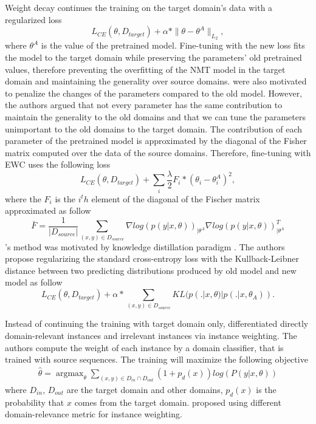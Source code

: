 Weight decay \citep{Miceli17regularization} continues the training on the target domain's data with a regularized loss 
\begin{equation}
L_{CE}(\theta,\mathit{D}_{target}) + \alpha * \parallel \theta - \theta^{A} \parallel_{L_2},
\end{equation}
where $\theta^{A}$ is the value of the pretrained model. Fine-tuning with the new loss fits the model to the target domain while preserving the parameters' old pretrained values, therefore preventing the overfitting of the NMT model in the target domain and maintaining the generality over source domains. \citet{Brian19overcoming, Kirk16overcoming, Saunders19domain} were also motivated to penalize the changes of the parameters compared to the old model. However, the authors argued that not every parameter has the same contribution to maintain the generality to the old domains and that we can tune the parameters unimportant to the old domains to the target domain. The contribution of each parameter of the pretrained model is approximated by the diagonal of the Fisher matrix computed over the data of the source domains. Therefore, fine-tuning with EWC uses the following loss
\begin{equation}
L_{CE}(\theta,\mathit{D}_{target}) + \sum_{i} \frac{\lambda}{2} F_i * (\theta_i - \theta_i^{A})^2,
\end{equation}
where the $F_i$ is the $i^th$ element of the diagonal of the Fischer matrix approximated as follow
\begin{equation}
\bar{F} = \frac{1}{|\mathit{D}_{source}|} \displaystyle{\mathop{\sum}_{(x,y)\in \mathit{D}_{source}}} \nabla log(p(y|x,\theta))_{| \theta^{A}} \nabla log(p(y|x,\theta))_{| \theta^{A}}^{T}
\end{equation}
\citet{Dakwle17fine}'s method was motivated by knowledge distillation paradigm \citep{Hinton15Distilling}. The authors propose regularizing the standard cross-entropy loss with the Kullback-Leibner distance \citep{Kullback51On} between two predicting distributions produced by old model and new model as follow
\begin{equation}
L_{CE}(\theta,\mathit{D}_{target}) + \alpha * \displaystyle{\mathop{\sum}_{(x,y)\in \mathit{D}_{source}}} KL(p(.|x,\theta) | p(.|x,\theta_{A})).
\end{equation}

Instead of continuing the training with target domain only, \citet{Chen17cost} differentiated directly domain-relevant instances and irrelevant instances via instance weighting. The authors compute the weight of each instance by a domain classifier, that is trained with source sequences. The training will maximize the following objective 
\begin{equation}
\begin{array}{rcl}
\hat{\theta} = \displaystyle{\mathop{\arg max}_{\theta} \mathop{\sum}_{(x,y)\in D_{in} \cap D_{out}}} (1+p_d(x))log(P(y|x,\theta))
\end{array}
\end{equation}
where $D_{in}$, $D_{out}$ are the target domain and other domains, $p_d(x)$ is the probability that $x$ comes from the target domain. \citet{Wang17instance} proposed using different domain-relevance metric for instance weighting. 

